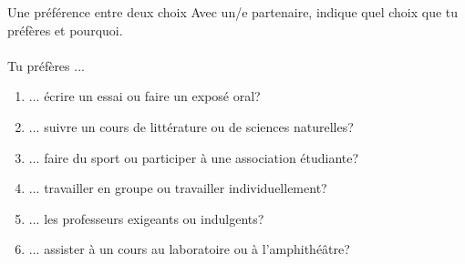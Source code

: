 \begin{frame}{Une préférence entre deux choix}
  Avec un/e partenaire, indique quel choix que tu préfères et pourquoi. \\
   \\
  \vspace{1cm}
  Tu préfères ...
  \begin{enumerate}
    \item ... écrire un essai ou faire un exposé oral?
    \item ... suivre un cours de littérature ou de sciences naturelles?
    \item ... faire du sport ou participer à une association étudiante?
    \item ... travailler en groupe ou travailler individuellement?
    \item ... les professeurs exigeants  ou indulgents?
    \item ... assister à un cours au laboratoire ou à l'amphithéâtre?
  \end{enumerate}
\end{frame}